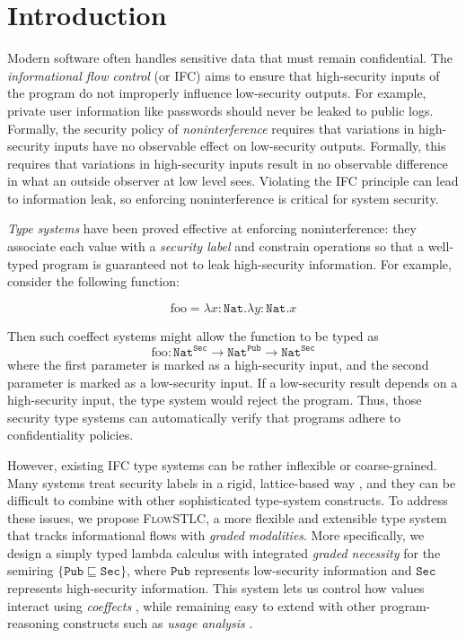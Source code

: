 \documentclass[conference]{IEEEtran}
\newcommand\lam[2]{\lambda #1.#2}
\newcommand\public{\texttt{Pub}}
\newcommand\secret{\texttt{Sec}}
\newcommand\nat{\texttt{Nat}}
\begin{document}
\section{Introduction}

Modern software often handles sensitive data that must remain confidential. The \emph{informational flow control} (or IFC) aims to ensure that high-security inputs of the program do not improperly influence low-security outputs. For example, private user information like passwords should never be leaked to public logs. Formally, the security policy of \emph{noninterference} requires that variations in high-security inputs have no observable effect on low-security outputs. Formally, this requires that variations in high-security inputs result in no observable difference in what an outside observer at low level sees. Violating the IFC principle can lead to information leak, so enforcing noninterference is critical for system security.

\emph{Type systems} \cite{sabelfeld2003language} \cite{abadi1999core} have been proved effective at enforcing noninterference: they associate each value with a \emph{security label} and constrain operations so that a well-typed program is guaranteed not to leak high-security information. For example, consider the following function:

\begin{equation}
	\text{foo}=\lam{x:\nat}{\lam{y:\nat}{x}}
\end{equation}

Then such coeffect systems might allow the function to be typed as
\begin{equation}
	\text{foo}:\nat^\secret\to\nat^\public\to\nat^\secret
\end{equation}
where the first parameter is marked as a high-security input, and the second parameter is marked as a low-security input. If a low-security result depends on a high-security input, the type system would reject the program. Thus, those security type systems can automatically verify that programs adhere to confidentiality policies.

However, existing IFC type systems can be rather inflexible or coarse-grained. Many systems treat security labels in a rigid, lattice-based way \cite{denning1976lattice}, and they can be difficult to combine with other sophisticated type-system constructs. To address these issues, we propose \textsc{FlowSTLC}, a more flexible and extensible type system that tracks informational flows with \emph{graded modalities}. More specifically, we design a simply typed lambda calculus with integrated \emph{graded necessity} for the semiring $\{\public\sqsubseteq\secret\}$, where $\public$ represents low-security information and $\secret$ represents high-security information. This system lets us control how values interact using \emph{coeffects} \cite{petricek2013coeffects} \cite{petricek2014coeffects}, while remaining easy to extend with other program-reasoning constructs such as \emph{usage analysis} \cite{orchard2019quantitative}.
\end{document}
